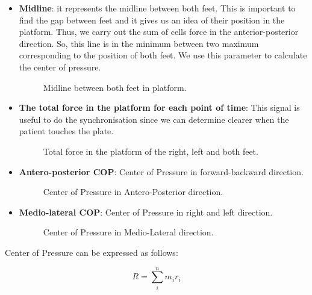 \begin{itemize}
	\item \textbf{Midline}: it represents the midline between both feet. This is important to find the gap between feet and it gives us an idea of their position in the platform. Thus, we carry out the sum of cells force in the anterior-posterior direction. So, this line is in the minimum between two maximum corresponding to the position of both feet. We use this parameter to calculate the center of pressure.
	\begin{figure}[H]
		\centering
		\caption{Midline between both feet in platform.}
		\label{fig:midlineForceplate}
	\end{figure}
	
	\item \textbf{The total force in the platform for each point of time}: This signal is useful to do the synchronisation since we can determine clearer when the patient touches the plate.
		\begin{figure}[H]
			\centering
			\caption{Total force in the platform of the right, left and both feet.}
			\label{fig:forceFP}
		\end{figure}
\newpage	
	\item \textbf{Antero-posterior COP}: Center of Pressure in forward-backward direction.
		\begin{figure}[H]
			\centering
			\caption{Center of Pressure in Antero-Posterior direction.}
			\label{fig:APCOP}
		\end{figure}	
	
	\item \textbf{Medio-lateral  COP}: Center of Pressure  in right and left direction.
			\begin{figure}[H]
				\centering
				\caption{Center of Pressure in Medio-Lateral direction.}
				\label{fig:MLCOP}
			\end{figure}
	
\end{itemize}
\newpage
Center of Pressure can be expressed as follows:

\begin{equation}
	\label{COP}
	R=\sum_{i}^{n}m_{i}r_{i}
\end{equation}


